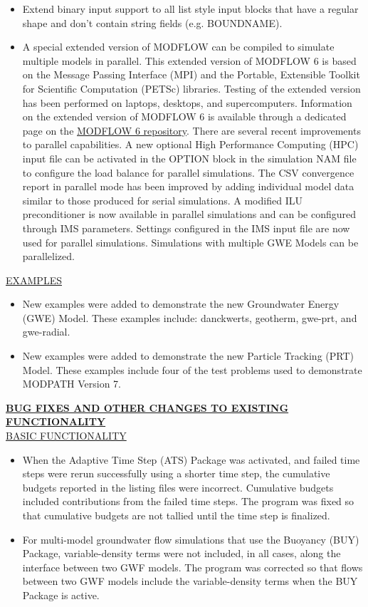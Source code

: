 \begin{itemize}
		\item Extend binary input support to all list style input blocks that have a regular shape and don't contain string fields (e.g. BOUNDNAME).
		\item A special extended version of MODFLOW can be compiled to simulate multiple models in parallel.  This extended version of MODFLOW 6 is based on the Message Passing Interface (MPI) and the Portable, Extensible Toolkit for Scientific Computation (PETSc) libraries.  Testing of the extended version has been performed on laptops, desktops, and supercomputers.  Information on the extended version of MODFLOW 6 is available through a dedicated page on the \href{https://github.com/MODFLOW-USGS/modflow6/wiki/Parallel-MODFLOW-User-Guide}{MODFLOW 6 repository}.  There are several recent improvements to parallel capabilities.  A new optional High Performance Computing (HPC) input file can be activated in the OPTION block in the simulation NAM file to configure the load balance for parallel simulations. The CSV convergence report in parallel mode has been improved by adding individual model data similar to those produced for serial simulations.  A modified ILU preconditioner is now available in parallel simulations and can be configured through IMS parameters.  Settings configured in the IMS input file are now used for parallel simulations.  Simulations with multiple GWE Models can be parallelized.
	\end{itemize}

	\underline{EXAMPLES}
	\begin{itemize}
		\item New examples were added to demonstrate the new Groundwater Energy (GWE) Model.  These examples include: danckwerts, geotherm, gwe-prt, and gwe-radial.
		\item New examples were added to demonstrate the new Particle Tracking (PRT) Model.  These examples include four of the test problems used to demonstrate MODPATH Version 7.
	\end{itemize}

	\textbf{\underline{BUG FIXES AND OTHER CHANGES TO EXISTING FUNCTIONALITY}} \\
	\underline{BASIC FUNCTIONALITY}
	\begin{itemize}
		\item When the Adaptive Time Step (ATS) Package was activated, and failed time steps were rerun successfully using a shorter time step, the cumulative budgets reported in the listing files were incorrect.  Cumulative budgets included contributions from the failed time steps.  The program was fixed so that cumulative budgets are not tallied until the time step is finalized.
		\item For multi-model groundwater flow simulations that use the Buoyancy (BUY) Package, variable-density terms were not included, in all cases, along the interface between two GWF models.  The program was corrected so that flows between two GWF models include the variable-density terms when the BUY Package is active.
	\end{itemize}

